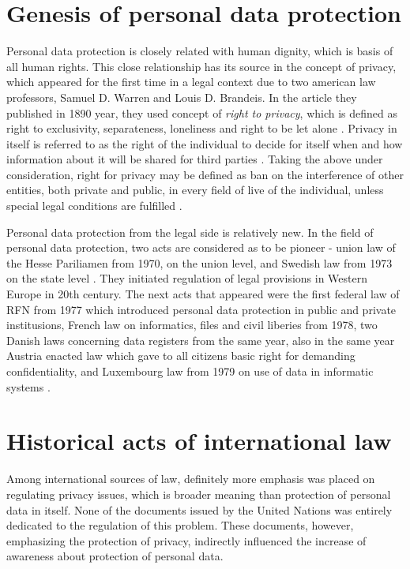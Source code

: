 \documentclass[en, noamssymb]{mgr}
\begin{document}
\section{Genesis of personal data protection}

Personal data protection is closely related with human dignity, which is basis of all human rights. This close relationship has its source in the concept of privacy, which appeared for the first time in a legal context due to two american law professors, Samuel D. Warren and Louis D. Brandeis. In the article they published in 1890 year, they used concept of \textit{right to privacy}, which is defined as right to exclusivity, separateness, loneliness and right to be let alone \cite{geneza_odo}. Privacy in itself is referred to as the right of the individual to decide for itself when and how information about it will be shared for third parties \cite{geneza_odo}. Taking the above under consideration, right for privacy may be defined as ban on the interference of other entities, both private and public, in every field of live of the individual, unless special legal conditions are fulfilled \cite{geneza_odo}.

\indent Personal data protection from the legal side is relatively new. In the field of personal data protection, two acts are considered as to be pioneer - union law of the Hesse Pariliamen from 1970, on the union level, and Swedish law from 1973 on the state level \cite{prawo_odo}. They initiated regulation of legal provisions in Western Europe 
in 20th century. The next acts that appeared were the first federal law of RFN from 1977  which introduced personal data protection in public and private institusions, French law on informatics, files and civil liberies from 1978, two Danish laws concerning data registers from the same year, also in the same year Austria enacted law which gave to all citizens basic right for demanding confidentiality, and Luxembourg law from 1979 on use of data in informatic systems \cite{prawo_odo}.


\section{Historical acts of international law}

\indent Among international sources of law, definitely more emphasis was placed on regulating privacy issues, which is broader meaning than protection of personal data in itself. None of the documents issued by the United Nations was entirely dedicated to the regulation of this problem. These documents, however, emphasizing the protection of privacy, indirectly influenced the increase of awareness about protection of personal data.
\end{document}
